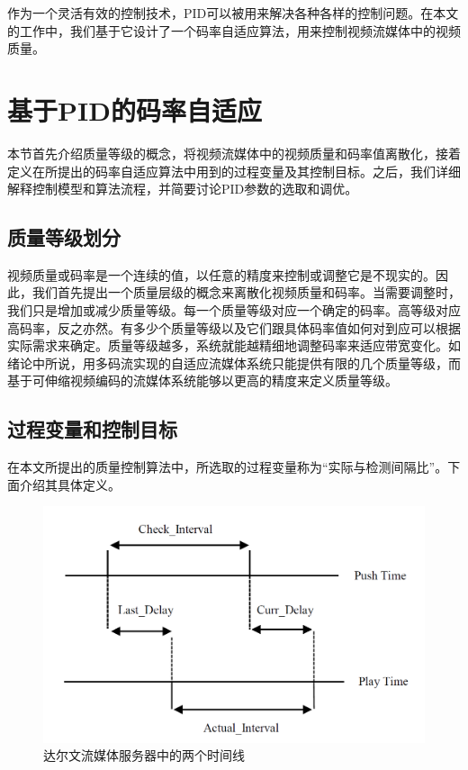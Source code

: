 作为一个灵活有效的控制技术，PID可以被用来解决各种各样的控制问题\supercite{Wong2004}\supercite{Li1999}。在本文的工作中，我们基于它设计了一个码率自适应算法，用来控制视频流媒体中的视频质量。

\section{基于PID的码率自适应}

本节首先介绍质量等级的概念，将视频流媒体中的视频质量和码率值离散化，接着定义在所提出的码率自适应算法中用到的过程变量及其控制目标。之后，我们详细解释控制模型和算法流程，并简要讨论PID参数的选取和调优。

\subsection{质量等级划分}

视频质量或码率是一个连续的值，以任意的精度来控制或调整它是不现实的。因此，我们首先提出一个质量层级的概念来离散化视频质量和码率。当需要调整时，我们只是增加或减少质量等级。每一个质量等级对应一个确定的码率。高等级对应高码率，反之亦然。有多少个质量等级以及它们跟具体码率值如何对到应可以根据实际需求来确定。质量等级越多，系统就能越精细地调整码率来适应带宽变化。如绪论中所说，用多码流实现的自适应流媒体系统只能提供有限的几个质量等级，而基于可伸缩视频编码的流媒体系统能够以更高的精度来定义质量等级。

\subsection{过程变量和控制目标}

在本文所提出的质量控制算法中，所选取的过程变量称为“实际与检测间隔比”。下面介绍其具体定义。

\begin{figure}[h]
	\centering
	\includegraphics[width = 0.9\linewidth]{figures/Intervals.png}
	\caption{达尔文流媒体服务器中的两个时间线 \label{fig:intervals}}
\end{figure}

